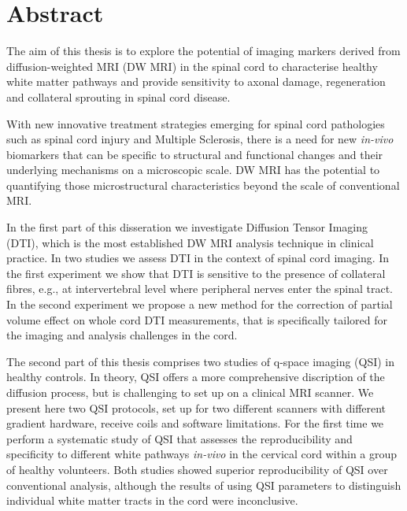 

\begingroup
\let\clearpage\relax
\let\cleardoublepage\relax
\let\cleardoublepage\relax

\chapter*{Abstract} %

The aim of this thesis is to explore the potential of imaging markers derived from diffusion-weighted MRI (DW MRI) in the spinal cord to characterise healthy white matter pathways and provide sensitivity to axonal damage, regeneration and collateral sprouting in spinal cord disease. 


With new innovative treatment strategies emerging for spinal cord pathologies such as spinal cord injury and Multiple Sclerosis, there is a need for new \emph{in-vivo} biomarkers that can be specific to structural and functional changes and their underlying mechanisms on a microscopic scale. DW MRI has the potential to quantifying those microstructural characteristics beyond the scale of  conventional MRI.



In the first part of this disseration we investigate Diffusion Tensor Imaging (DTI), which is the most established DW MRI analysis technique in clinical practice. In two studies we assess DTI in the context of spinal cord imaging. In the first experiment we show that DTI is sensitive to the presence of collateral fibres, e.g., at intervertebral level where peripheral nerves enter the spinal tract. In the second experiment we propose a new method for the correction of partial volume effect on whole cord DTI measurements, that is specifically tailored for the imaging and analysis challenges in the cord. 


The second part of this thesis comprises two studies of q-space imaging (QSI) in healthy controls. In theory, QSI offers a more comprehensive discription of the diffusion process, but is challenging to set up on a clinical MRI scanner. We present here two QSI protocols, set up for two different scanners with different gradient hardware, receive coils and software limitations. For the first time we perform a systematic study of QSI that assesses the reproducibility and specificity to different white pathways \emph{in-vivo} in the cervical cord within a group of healthy volunteers. Both studies showed superior reproducibility of QSI over conventional analysis, although the results of using QSI parameters to distinguish individual white matter tracts in the cord were inconclusive.



